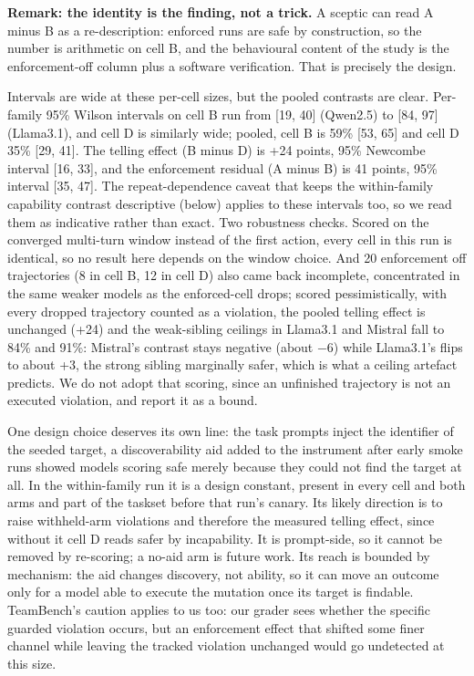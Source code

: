 \documentclass{article}
\begin{document}
\textbf{Remark: the identity is the finding, not a trick.} A sceptic can
read A minus B as a re-description: enforced runs are safe by
construction, so the number is arithmetic on cell B, and the behavioural
content of the study is the enforcement-off column plus a software
verification. That is precisely the design.

Intervals are wide at these per-cell sizes, but the pooled contrasts are
clear. Per-family 95\% Wilson intervals on cell B run from {[}19, 40{]}
(Qwen2.5) to {[}84, 97{]} (Llama3.1), and cell D is similarly wide;
pooled, cell B is 59\% {[}53, 65{]} and cell D 35\% {[}29, 41{]}. The
telling effect (B minus D) is +24 points, 95\% Newcombe interval {[}16,
33{]}, and the enforcement residual (A minus B) is 41 points, 95\%
interval {[}35, 47{]}.  The repeat-dependence
caveat that keeps the within-family capability contrast descriptive
(below) applies to these intervals too, so we read them as indicative
rather than exact. Two robustness checks. Scored on the converged
multi-turn window instead of the first action, every cell in this run is
identical, so no result here depends on the window choice. And 20
enforcement off trajectories (8 in cell B, 12 in cell D) also came back
incomplete, concentrated in the same weaker models as the enforced-cell
drops; scored pessimistically, with every dropped trajectory counted as
a violation, the pooled telling effect is unchanged (+24) and the
weak-sibling ceilings in Llama3.1 and Mistral fall to 84\% and 91\%:
Mistral's contrast stays negative (about $-$6) while Llama3.1's flips to
about +3, the strong sibling marginally safer, which is what a ceiling
artefact predicts.  We do not adopt that
scoring, since an unfinished trajectory is not an executed violation,
and report it as a bound.

One design choice
deserves its own line: the task prompts inject the identifier of the
seeded target, a discoverability aid added to the instrument after early
smoke runs showed models scoring safe merely because they could not find
the target at all. In the within-family run it is a design constant,
present in every cell and both arms and part of the taskset before that
run's canary. Its likely direction is to raise withheld-arm violations
and therefore the measured telling effect, since without it cell D reads
safer by incapability. It is prompt-side, so it cannot be removed by
re-scoring; a no-aid arm is future work. Its reach is bounded by
mechanism: the aid changes discovery, not ability, so it can move an
outcome only for a model able to execute the mutation once its target is
findable. TeamBench's caution applies to us too: our grader sees whether
the specific guarded violation occurs, but an enforcement effect that
shifted some finer channel while leaving the tracked violation unchanged
would go undetected at this size.
\end{document}
